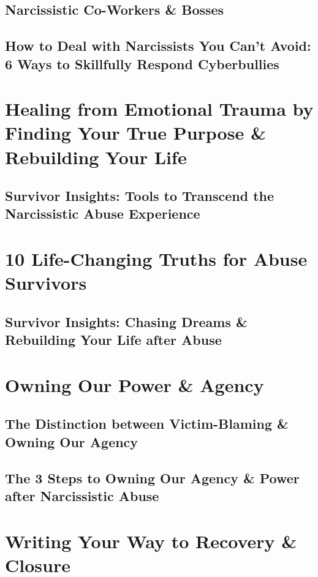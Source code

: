 \documentclass[oneside]{book}
\numberwithin{equation}{section}
\begin{document}
\subsection{Narcissistic Co-Workers \& Bosses}

\subsection{How to Deal with Narcissists You Can't Avoid: 6 Ways to Skillfully Respond Cyberbullies}

\section{Healing from Emotional Trauma by Finding Your True Purpose \& Rebuilding Your Life}

\subsection{Survivor Insights: Tools to Transcend the Narcissistic Abuse Experience}

\section{10 Life-Changing Truths for Abuse Survivors}

\subsection{Survivor Insights: Chasing Dreams \& Rebuilding Your Life after Abuse}

\section{Owning Our Power \& Agency}

\subsection{The Distinction between Victim-Blaming \& Owning Our Agency}

\subsection{The 3 Steps to Owning Our Agency \& Power after Narcissistic Abuse}

\section{Writing Your Way to Recovery \& Closure}
\end{document}
